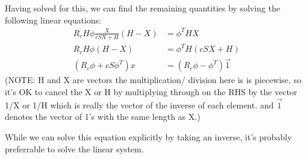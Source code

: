 \documentclass{article}
\begin{document}
Having solved for this, we can find the remaining quantities by solving the following linear equations: 
\begin{equation}\begin{array}{rl}
R_c H \phi \frac{\textstyle{X}}{\textstyle{cSX + H}} (H-X) &= \phi^T H X \\
R_c H \phi (H-X) &= \phi^T H \left(cS X + H  \right) \\
\left(R_c \phi + c S \phi^T\right) x & = \left( R_c \phi - \phi^T \right) \vec 1 
\end{array}\end{equation}
(NOTE: H and X are vectors the multiplication/ division here is is piecewise, so it's OK to cancel the X or H by multiplying through on the RHS by the vector 1/X or 1/H which is really the vector of the inverse of each element. and $\vec 1$ denotes the vector of 1's with the same length as X.) 

While we can solve this equation explicitly by taking an inverse, it's probably preferrable to solve the linear system. 
\end{document}
